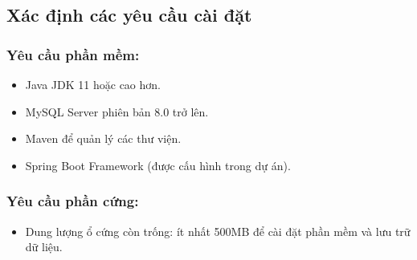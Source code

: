 \documentclass{article}
\begin{document}
\subsection{Xác định các yêu cầu cài đặt}
    \subsubsection{\textbf{Yêu cầu phần mềm}:}
    \begin{itemize}
        \item Java JDK 11 hoặc cao hơn.
        \item MySQL Server phiên bản 8.0 trở lên.
        \item Maven để quản lý các thư viện.
        \item Spring Boot Framework (được cấu hình trong dự án).
    \end{itemize}
    \subsubsection{\textbf{Yêu cầu phần cứng}:}
    \begin{itemize}
        \item Dung lượng ổ cứng còn trống: ít nhất 500MB để cài đặt phần mềm và lưu trữ dữ liệu.
    \end{itemize}
    
\end{document}
